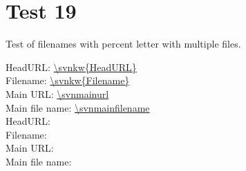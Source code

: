 \documentclass[12pt]{report}
\begin{document}
\chapter{Test 19}
Test of filenames with percent letter with multiple files.

\noindent
HeadURL: \url{\svnkw{HeadURL}} \\
Filename: \url{\svnkw{Filename}} \\
Main URL: \url{\svnmainurl} \\
Main file name: \url{\svnmainfilename} \\

\noindent
HeadURL:  \\
Filename:  \\
Main URL: \svnnolinkurl{\svnmainurl} \\
Main file name: \svnnolinkurl{\svnmainfilename} \\


\end{document}
